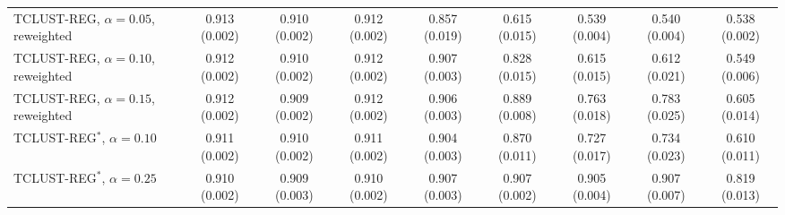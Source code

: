 \begin{table}[htbp]
{\begin{tabular}{lcccccccc}
TCLUST-REG, $\alpha=0.05$, reweighted & 0.913 (0.002) & 0.910 (0.002) & 0.912 (0.002) & 0.857 (0.019) & 0.615 (0.015) & 0.539 (0.004) & 0.540 (0.004) & 0.538 (0.002) \\
TCLUST-REG, $\alpha=0.10$, reweighted & 0.912 (0.002) & 0.910 (0.002) & 0.912 (0.002) & 0.907 (0.003) & 0.828 (0.015) & 0.615 (0.015) & 0.612 (0.021) & 0.549 (0.006) \\
TCLUST-REG, $\alpha=0.15$, reweighted & 0.912 (0.002) & 0.909 (0.002) & 0.912 (0.002) & 0.906 (0.003) & 0.889 (0.008) & 0.763 (0.018) & 0.783 (0.025) & 0.605 (0.014) \\
TCLUST-REG$^{\ast}$, $\alpha=0.10$ & 0.911 (0.002) & 0.910 (0.002) & 0.911 (0.002) & 0.904 (0.003) & 0.870 (0.011) & 0.727 (0.017) & 0.734 (0.023) & 0.610 (0.011) \\
TCLUST-REG$^{\ast}$, $\alpha=0.25$ & 0.910 (0.002) & 0.909 (0.003) & 0.910 (0.002) & 0.907 (0.003) & 0.907 (0.002) & 0.905 (0.004) & 0.907 (0.007) & 0.819 (0.013) \\
\bottomrule
\end{tabular}}
\end{table}

